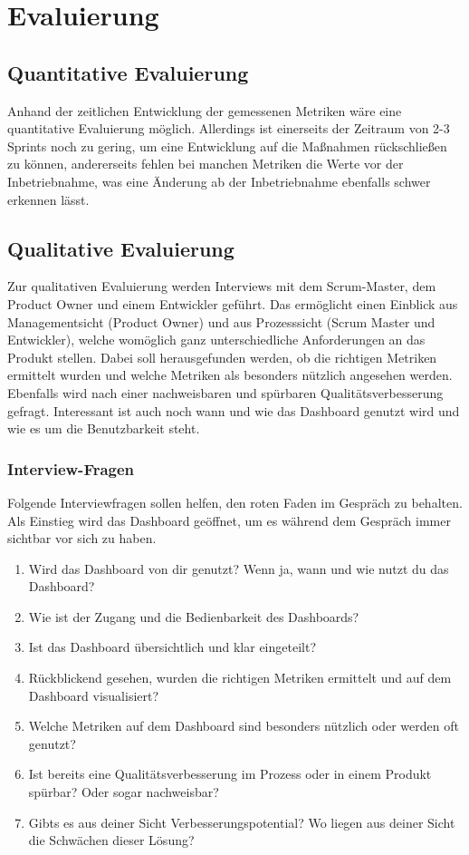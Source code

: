 \chapter{Evaluierung}

\section{Quantitative Evaluierung}

Anhand der zeitlichen Entwicklung der gemessenen Metriken wäre eine quantitative Evaluierung möglich.
Allerdings ist einerseits der Zeitraum von 2-3 Sprints noch zu gering, um eine Entwicklung auf die Maßnahmen rückschließen zu können,
andererseits fehlen bei manchen Metriken die Werte vor der Inbetriebnahme, was eine Änderung ab der Inbetriebnahme ebenfalls schwer erkennen lässt.

\clearpage
\section{Qualitative Evaluierung}

Zur qualitativen Evaluierung werden Interviews mit dem Scrum-Master, dem Product Owner und einem Entwickler geführt.
Das ermöglicht einen Einblick aus Managementsicht (Product Owner) und aus Prozesssicht (Scrum Master und Entwickler), welche womöglich ganz unterschiedliche Anforderungen an das Produkt stellen.
Dabei soll herausgefunden werden, ob die richtigen Metriken ermittelt wurden und welche Metriken als besonders nützlich angesehen werden.
Ebenfalls wird nach einer nachweisbaren und spürbaren Qualitätsverbesserung gefragt.
Interessant ist auch noch wann und wie das Dashboard genutzt wird und wie es um die Benutzbarkeit steht.

\subsection{Interview-Fragen}

Folgende Interviewfragen sollen helfen, den roten Faden im Gespräch zu behalten.
Als Einstieg wird das Dashboard geöffnet, um es während dem Gespräch immer sichtbar vor sich zu haben.

\begin{enumerate}
    \item Wird das Dashboard von dir genutzt? Wenn ja, wann und wie nutzt du das Dashboard?
    \item Wie ist der Zugang und die Bedienbarkeit des Dashboards?
    \item Ist das Dashboard übersichtlich und klar eingeteilt?
    \item Rückblickend gesehen, wurden die richtigen Metriken ermittelt und auf dem Dashboard visualisiert?
    \item Welche Metriken auf dem Dashboard sind besonders nützlich oder werden oft genutzt?
    \item Ist bereits eine Qualitätsverbesserung im Prozess oder in einem Produkt spürbar? Oder sogar nachweisbar?
    \item Gibts es aus deiner Sicht Verbesserungspotential? Wo liegen aus deiner Sicht die Schwächen dieser Lösung?
\end{enumerate}

